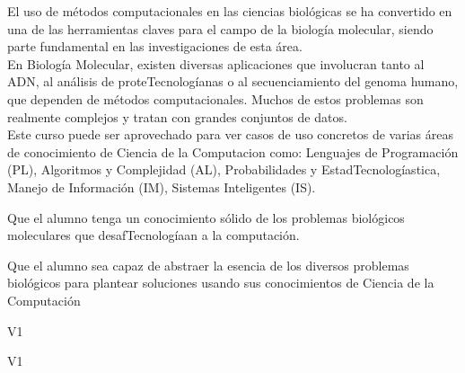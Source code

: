 \begin{syllabus}


\begin{justification}
El uso de métodos computacionales en las ciencias biológicas se ha convertido en una de las herramientas claves para el campo de la biología molecular, siendo parte fundamental en las investigaciones de esta área. 
\\
En Biología Molecular, existen diversas aplicaciones que involucran tanto al ADN, al análisis de proteTecnologíanas o al secuenciamiento del genoma humano, que dependen de métodos computacionales. Muchos de estos problemas son realmente complejos y tratan con grandes conjuntos de datos. 
\\
Este curso puede ser aprovechado para ver casos de uso concretos de varias áreas de conocimiento de Ciencia de la Computacion como: Lenguajes de Programación (PL), Algoritmos y Complejidad (AL), Probabilidades y EstadTecnologíastica, Manejo de Información (IM), Sistemas Inteligentes (IS).
\end{justification}

\begin{goals}
\item Que el alumno tenga un conocimiento sólido de los problemas biológicos moleculares que desafTecnologíaan a la computación.
\item Que el alumno sea capaz de abstraer la esencia de los diversos problemas biológicos para plantear soluciones usando sus conocimientos de Ciencia de la Computación
\end{goals}

\begin{outcomes}{V1}
    \item {}
    \item {}
    \item {}
\end{outcomes}

\begin{competences}{V1}
    \item {} 
    \item {}
    \item {}
\end{competences}


\end{syllabus}
